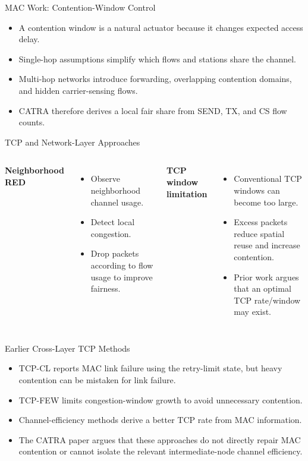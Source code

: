 \begin{frame}{MAC Work: Contention-Window Control}
\begin{itemize}
\item A contention window is a natural actuator because it changes expected access delay.
\item Single-hop assumptions simplify which flows and stations share the channel.
\item Multi-hop networks introduce forwarding, overlapping contention domains, and hidden carrier-sensing flows.
\item CATRA therefore derives a local fair share from SEND, TX, and CS flow counts.
\end{itemize}
\end{frame}

\begin{frame}{TCP and Network-Layer Approaches}
\begin{columns}[T,onlytextwidth]
\textbf{Neighborhood RED}
\begin{itemize}
\item Observe neighborhood channel usage.
\item Detect local congestion.
\item Drop packets according to flow usage to improve fairness.
\end{itemize}
\textbf{TCP window limitation}
\begin{itemize}
\item Conventional TCP windows can become too large.
\item Excess packets reduce spatial reuse and increase contention.
\item Prior work argues that an optimal TCP rate/window may exist.
\end{itemize}
\end{columns}
\end{frame}

\begin{frame}{Earlier Cross-Layer TCP Methods}
\begin{itemize}
\item TCP-CL reports MAC link failure using the retry-limit state, but heavy contention can be mistaken for link failure.
\item TCP-FEW limits congestion-window growth to avoid unnecessary contention.
\item Channel-efficiency methods derive a better TCP rate from MAC information.
\item The CATRA paper argues that these approaches do not directly repair MAC contention or cannot isolate the relevant intermediate-node channel efficiency.
\end{itemize}
\vspace{0.35cm}
\end{frame}

